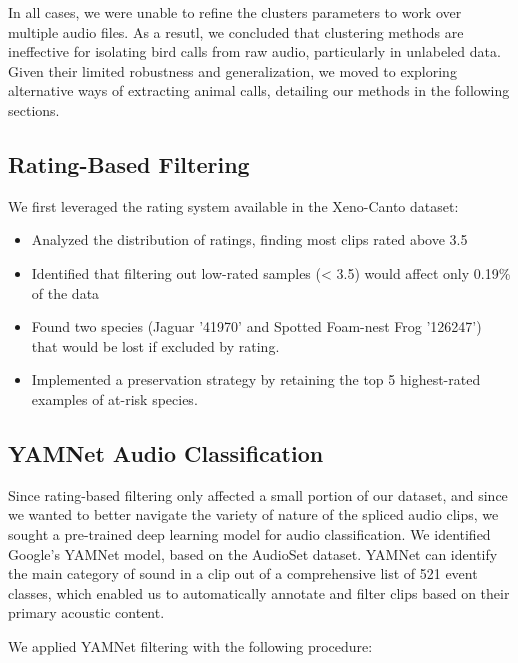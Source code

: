 \documentclass[10pt]{article}
\begin{document}
In all cases, we were unable to refine the clusters parameters to work over multiple audio files. As a resutl, we concluded that clustering methods are ineffective for isolating bird calls from raw audio, particularly in unlabeled data. Given their limited robustness and generalization, we moved to exploring alternative ways of extracting animal calls, detailing our methods in the following sections.

\subsection*{Rating-Based Filtering}

We first leveraged the rating system available in the Xeno-Canto dataset:

\begin{itemize}
  \item Analyzed the distribution of ratings, finding most clips rated above 3.5
  \item Identified that filtering out low-rated samples (< 3.5) would affect only 0.19\% of the data
  \item Found two species (Jaguar '41970' and Spotted Foam-nest Frog '126247') that would be lost if excluded by rating.
  \item Implemented a preservation strategy by retaining the top 5 highest-rated examples of at-risk species.
\end{itemize}

\subsection*{YAMNet Audio Classification}

Since rating-based filtering only affected a small portion of our dataset, and since we wanted to better navigate the variety of nature of the spliced audio clips, we sought a pre-trained deep learning model for audio classification. We identified Google's YAMNet model,  based on the AudioSet dataset. YAMNet can identify the main category of sound in a clip out of a comprehensive list of 521 event classes, which enabled us to automatically annotate and filter clips based on their primary acoustic content.

We applied YAMNet filtering with the following procedure:
\end{document}
